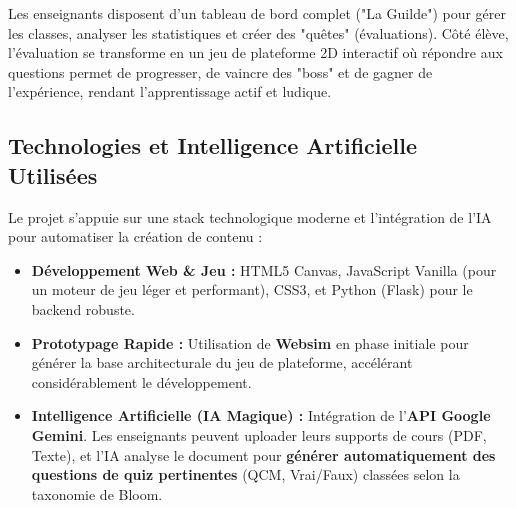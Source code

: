 \documentclass[12pt,a4paper]{article}
\begin{document}
Les enseignants disposent d'un tableau de bord complet ("La Guilde") pour gérer les classes, analyser les statistiques et créer des "quêtes" (évaluations). Côté élève, l'évaluation se transforme en un jeu de plateforme 2D interactif où répondre aux questions permet de progresser, de vaincre des "boss" et de gagner de l'expérience, rendant l'apprentissage actif et ludique.

\subsection*{Technologies et Intelligence Artificielle Utilisées}
Le projet s'appuie sur une stack technologique moderne et l'intégration de l'IA pour automatiser la création de contenu :

\begin{itemize}[label=\textcolor{techorange}{\textbullet}, leftmargin=*]
    \item \textbf{Développement Web \& Jeu :} HTML5 Canvas, JavaScript Vanilla (pour un moteur de jeu léger et performant), CSS3, et Python (Flask) pour le backend robuste.
    \item \textbf{Prototypage Rapide :} Utilisation de \textbf{Websim} en phase initiale pour générer la base architecturale du jeu de plateforme, accélérant considérablement le développement.
    \item \textbf{Intelligence Artificielle (IA Magique) :} Intégration de l'\textbf{API Google Gemini}. Les enseignants peuvent uploader leurs supports de cours (PDF, Texte), et l'IA analyse le document pour \textbf{générer automatiquement des questions de quiz pertinentes} (QCM, Vrai/Faux) classées selon la taxonomie de Bloom.
\end{itemize}
\end{document}
